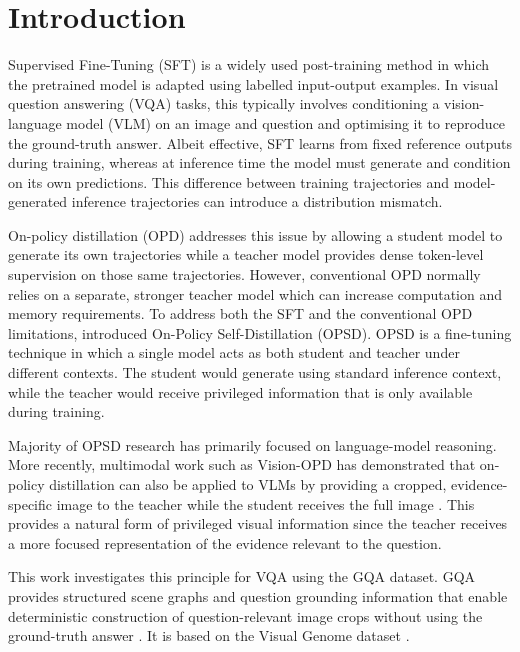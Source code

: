 \section{Introduction}\label{intro}

Supervised Fine-Tuning (SFT) is a widely used post-training method in which the pretrained model
is adapted using labelled input-output examples. In visual question answering (VQA) tasks, this 
typically involves conditioning a vision-language model (VLM) on an image and question and 
optimising it to reproduce the ground-truth answer. Albeit effective, SFT learns from fixed
reference outputs during training, whereas at inference time the model must generate and condition 
on its own predictions. This difference between training trajectories and model-generated inference
trajectories can introduce a distribution mismatch.

On-policy distillation (OPD) addresses this issue by allowing a student model to generate its
own trajectories while a teacher model provides dense token-level supervision on those same 
trajectories. However, conventional OPD normally relies on a separate, stronger teacher model which
can increase computation and memory requirements. To address both the SFT and the conventional OPD
limitations, \textcite{zhao2601self} introduced On-Policy Self-Distillation (OPSD). OPSD is a fine-tuning
technique in which a single model acts as both student and teacher under different contexts. The student
would generate using standard inference context, while the teacher would receive privileged information
that is only available during training.

Majority of OPSD research has primarily focused on language-model reasoning. More recently,
multimodal work such as Vision-OPD has demonstrated that on-policy distillation can also be applied
to VLMs by providing a cropped, evidence-specific image to the teacher while the student receives the
full image \parencite{yuan2026vision}. This provides a natural form of privileged visual information since the teacher receives
a more focused representation of the evidence relevant to the question.

This work investigates this principle for VQA using the GQA dataset. GQA provides structured 
scene graphs and question grounding information that enable deterministic construction of
question-relevant image crops without using the ground-truth answer \parencite{hudson2019gqa}. It is based on the Visual Genome 
dataset \parencite{krishna2017visual}. 

